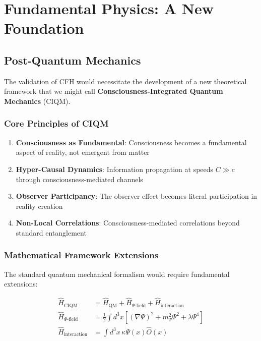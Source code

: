 \documentclass[12pt,article]{memoir}
\begin{document}
\chapter{Fundamental Physics: A New Foundation}

\section{Post-Quantum Mechanics}

The validation of CFH would necessitate the development of a new theoretical framework that we might call \textbf{Consciousness-Integrated Quantum Mechanics} (CIQM).

\subsection{Core Principles of CIQM}

\begin{enumerate}
    \item \textbf{Consciousness as Fundamental}: Consciousness becomes a fundamental aspect of reality, not emergent from matter
    \item \textbf{Hyper-Causal Dynamics}: Information propagation at speeds $C \gg c$ through consciousness-mediated channels
    \item \textbf{Observer Participancy}: The observer effect becomes literal participation in reality creation
    \item \textbf{Non-Local Correlations}: Consciousness-mediated correlations beyond standard entanglement
\end{enumerate}

\subsection{Mathematical Framework Extensions}

The standard quantum mechanical formalism would require fundamental extensions:

\begin{align}
\hat{H}_{\text{CIQM}} &= \hat{H}_{\text{QM}} + \hat{H}_{\Psi\text{-field}} + \hat{H}_{\text{interaction}} \\
\hat{H}_{\Psi\text{-field}} &= \frac{1}{2}\int d^3x \left[(\nabla\Psi)^2 + m_\Psi^2\Psi^2 + \lambda\Psi^4\right] \\
\hat{H}_{\text{interaction}} &= \int d^3x \, \kappa\Psi(x)\hat{O}(x)
\end{align}
\end{document}
